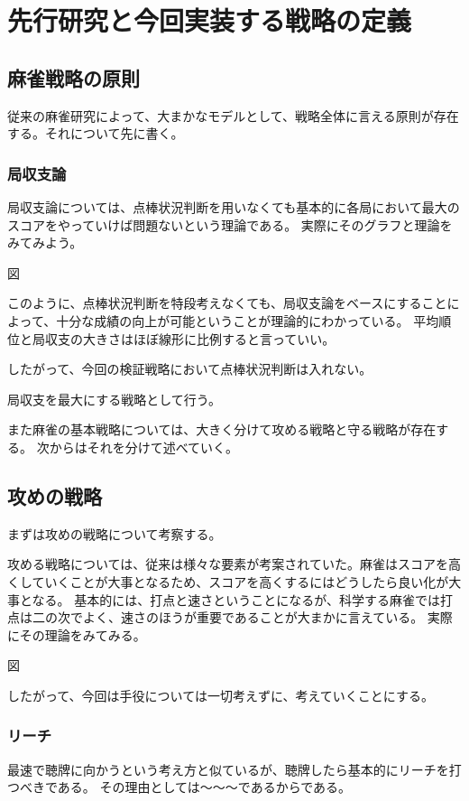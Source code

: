 \chapter{先行研究と今回実装する戦略の定義}
\label{chap:strategy}

\section{麻雀戦略の原則}
従来の麻雀研究によって、大まかなモデルとして、戦略全体に言える原則が存在する。それについて先に書く。

\subsection{局収支論}

局収支論については、点棒状況判断を用いなくても基本的に各局において最大のスコアをやっていけば問題ないという理論である。
実際にそのグラフと理論をみてみよう。

図

このように、点棒状況判断を特段考えなくても、局収支論をベースにすることによって、十分な成績の向上が可能ということが理論的にわかっている。
平均順位と局収支の大きさはほぼ線形に比例すると言っていい。

したがって、今回の検証戦略において点棒状況判断は入れない。

局収支を最大にする戦略として行う。

また麻雀の基本戦略については、大きく分けて攻める戦略と守る戦略が存在する。
次からはそれを分けて述べていく。

\section{攻めの戦略}

まずは攻めの戦略について考察する。

攻める戦略については、従来は様々な要素が考案されていた。麻雀はスコアを高くしていくことが大事となるため、スコアを高くするにはどうしたら良い化が大事となる。
基本的には、打点と速さということになるが、科学する麻雀では打点は二の次でよく、速さのほうが重要であることが大まかに言えている。
実際にその理論をみてみる。

図

したがって、今回は手役については一切考えずに、考えていくことにする。

\subsection{リーチ}
最速で聴牌に向かうという考え方と似ているが、聴牌したら基本的にリーチを打つべきである。
その理由としては〜〜〜であるからである。

